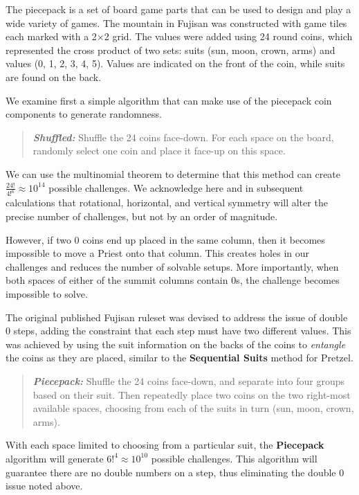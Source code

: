\documentclass[journal]{IEEEtran}
\begin{document}
The piecepack is a set of board game parts that can be used to design and play a wide variety of games\cite{GAMESYSTEM}. The mountain in Fujisan was constructed with game tiles each marked with a 2$\times$2 grid. The values were added using 24 round coins, which represented the cross product of two sets: suits (sun, moon, crown, arms) and values (0, 1, 2, 3, 4, 5). Values are indicated on the front of the coin, while suits are found on the back.

We examine first a simple algorithm that can make use of the piecepack coin components to generate randomness. 

\begin{quote}
    
  {\it \bf Shuffled:} Shuffle the 24 coins face-down. For each space on the board, randomly select one coin and place it face-up on this space.
  
\end{quote}

We can use the multinomial theorem to determine that this method can create
$\frac{24!}{4!^{6}} \approx 10^{14}$ possible challenges.  We acknowledge here and in subsequent calculations that rotational, horizontal, and vertical symmetry will alter the precise number of challenges, but not by an order of magnitude.

However, if two 0 coins end up placed in the same column, then it becomes impossible to move a Priest onto that column. This creates holes in our challenges and reduces the number of solvable setups. 
More importantly, when both spaces of either of the summit columns contain 0s, the challenge becomes impossible to solve.

The original published Fujisan ruleset was devised to address the issue of double 0 steps, adding the constraint that each step must have two different values. This was achieved by using the suit information on the backs of the coins to \textit{entangle} the coins as they are placed, similar to the \textbf{Sequential Suits} method for Pretzel.

\begin{quote}
    
  {\it \bf Piecepack:} Shuffle the 24 coins face-down, and separate into four groups based on their suit. Then repeatedly place two coins on the two right-most available spaces, choosing from each of the suits in turn (sun, moon, crown, arms).
\end{quote}

With each space limited to choosing from a particular suit, the \textbf{Piecepack} algorithm will generate $6!^4 \approx 10^{10}$ possible challenges. This algorithm will guarantee there are no double numbers on a step, thus eliminating the double 0 issue noted above. 
\end{document}
